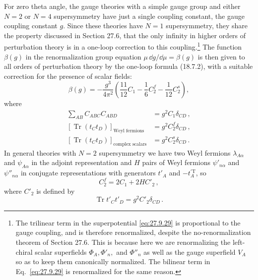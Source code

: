 For zero theta angle, the gauge theories with a simple gauge group and either
\(N=2\) or \(N=4\) supersymmetry have just a single coupling constant, the
gauge coupling constant \(g\). Since these theories have \(N=1\)
supersymmetry, they share the property discussed in Section 27.6, that the
only infinity in higher orders of perturbation theory is in a one-loop
correction to this coupling.\footnote{The trilinear term in the
superpotential \eqref{eq:27.9.29} is proportional to the gauge coupling, and
is therefore renormalized, despite the no-renormalization theorem of Section
27.6. This is because here we are renormalizing the left-chiral scalar
superfields \(\Phi_A,\Phi'_n,\) and \(\Phi''_n\) as well as the gauge
superfield \(V_A\) so as to keep them canonically normalized. The bilinear
term in Eq.~\eqref{eq:27.9.29} is renormalized for the same reason.} The
function \(\beta(g)\) in the renormalization group equation
\(\mu\,\dd g/\dd\mu=\beta(g)\) is then given to all orders of perturbation theory
by the one-loop formula (18.7.2), with a suitable correction for the presence
of scalar fields:
\begin{equation}
  \beta(g)
  =-\frac{g^3}{4\pi^2}
    \left(\frac{11}{12}C_1-\frac16C_2^f-\frac1{12}C_2^s\right),
  \tag{27.9.45}\label{eq:27.9.45}
\end{equation}
where
\begin{equation}
  \begin{aligned}
  \sum_{AB}C_{ABC}C_{ABD}
  &=g^2C_1\delta_{CD}\,,
  \\
  \left[\operatorname{Tr}(t_Ct_D)\right]_{\text{Weyl fermions}}
  &=g^2C_2^f\delta_{CD}\,,
  \\
  \left[\operatorname{Tr}(t_Ct_D)\right]_{\text{complex scalars}}
  &=g^2C_2^s\delta_{CD}\,.
  \end{aligned}
  \tag{27.9.46}\label{eq:27.9.46}
\end{equation}
In general theories with \(N=2\) supersymmetry we have two Weyl fermions
\(\lambda_{A\alpha}\) and \(\psi_{A\alpha}\) in the adjoint representation
and \(H\) pairs of Weyl fermions \(\psi'_{n\alpha}\) and
\(\psi''_{n\alpha}\) in conjugate representations with generators \(t'_A\)
and \(-t_A^{\prime\mathrm T}\), so
\begin{equation}
  C_2^f=2C_1+2HC'_2\,,
  \tag{27.9.47}\label{eq:27.9.47}
\end{equation}
where \(C'_2\) is defined by
\begin{equation}
  \operatorname{Tr}t'_Ct'_D=g^2C'_2\delta_{CD}\,.
  \tag{27.9.48}\label{eq:27.9.48}
\end{equation}
